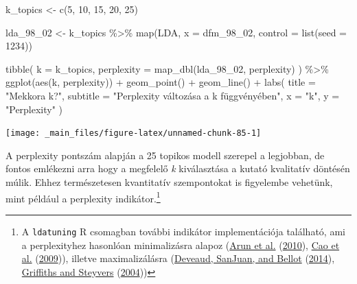 \documentclass[
]{book}
\newenvironment{Shaded}{\begin{snugshade}}{\end{snugshade}}
\newcommand{\AttributeTok}[1]{\textcolor[rgb]{0.77,0.63,0.00}{#1}}
\newcommand{\DecValTok}[1]{\textcolor[rgb]{0.00,0.00,0.81}{#1}}
\newcommand{\FunctionTok}[1]{\textcolor[rgb]{0.00,0.00,0.00}{#1}}
\newcommand{\NormalTok}[1]{#1}
\newcommand{\OtherTok}[1]{\textcolor[rgb]{0.56,0.35,0.01}{#1}}
\newcommand{\SpecialCharTok}[1]{\textcolor[rgb]{0.00,0.00,0.00}{#1}}
\newcommand{\StringTok}[1]{\textcolor[rgb]{0.31,0.60,0.02}{#1}}
\begin{document}
\begin{Shaded}
\begin{Highlighting}[]
\NormalTok{k\_topics }\OtherTok{\textless{}{-}} \FunctionTok{c}\NormalTok{(}\DecValTok{5}\NormalTok{, }\DecValTok{10}\NormalTok{, }\DecValTok{15}\NormalTok{, }\DecValTok{20}\NormalTok{, }\DecValTok{25}\NormalTok{)}

\NormalTok{lda\_98\_02 }\OtherTok{\textless{}{-}}\NormalTok{ k\_topics }\SpecialCharTok{\%\textgreater{}\%}
  \FunctionTok{map}\NormalTok{(LDA, }\AttributeTok{x =}\NormalTok{ dfm\_98\_02, }\AttributeTok{control =} \FunctionTok{list}\NormalTok{(}\AttributeTok{seed =} \DecValTok{1234}\NormalTok{))}


\FunctionTok{tibble}\NormalTok{(}
  \AttributeTok{k =}\NormalTok{ k\_topics,}
  \AttributeTok{perplexity =} \FunctionTok{map\_dbl}\NormalTok{(lda\_98\_02, perplexity)}
\NormalTok{) }\SpecialCharTok{\%\textgreater{}\%}
  \FunctionTok{ggplot}\NormalTok{(}\FunctionTok{aes}\NormalTok{(k, perplexity)) }\SpecialCharTok{+}
  \FunctionTok{geom\_point}\NormalTok{() }\SpecialCharTok{+}
  \FunctionTok{geom\_line}\NormalTok{() }\SpecialCharTok{+}
  \FunctionTok{labs}\NormalTok{(}
    \AttributeTok{title =} \StringTok{"Mekkora k?"}\NormalTok{,}
    \AttributeTok{subtitle =} \StringTok{"Perplexity változása a k függvényében"}\NormalTok{,}
    \AttributeTok{x =} \StringTok{"k"}\NormalTok{,}
    \AttributeTok{y =} \StringTok{"Perplexity"}
\NormalTok{  )}
\end{Highlighting}
\end{Shaded}

\begin{center}\texttt{[image: \_main\_files/figure-latex/unnamed-chunk-85-1]} \end{center}

A perplexity pontszám alapján a 25 topikos modell szerepel a legjobban,
de fontos emlékezni arra hogy a megfelelő \emph{k} kiválasztása a kutató
kvalitatív döntésén múlik. Ehhez természetesen kvantitatív szempontokat
is figyelembe vehetünk, mint például a perplexity indikátor.\footnote{A
  \texttt{ldatuning} R csomagban további indikátor implementációja
  található, ami a perplexityhez hasonlóan minimalizásra alapoz
  (\protect\hyperlink{ref-arun2010finding}{Arun et al.}
  (\protect\hyperlink{ref-arun2010finding}{2010}),
  \protect\hyperlink{ref-cao2009density}{Cao et al.}
  (\protect\hyperlink{ref-cao2009density}{2009})), illetve
  maximalizálásra (\protect\hyperlink{ref-deveaud2014accurate}{Deveaud,
  SanJuan, and Bellot}
  (\protect\hyperlink{ref-deveaud2014accurate}{2014}),
  \protect\hyperlink{ref-griffiths2004}{Griffiths and Steyvers}
  (\protect\hyperlink{ref-griffiths2004}{2004}))}
\end{document}
